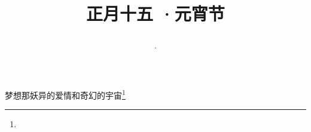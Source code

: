 \title{\date[d=24,m=2,y=2024][year:cn-y,年,month:cn,day:cn,日,·,weekday]·正月十五 ·元宵节}
梦想那妖异的爱情和奇幻的宇宙\footnote{ }

